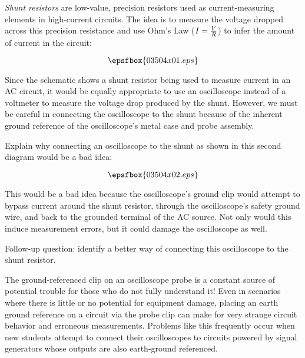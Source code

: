 

{\it Shunt resistors} are low-value, precision resistors used as current-measuring elements in high-current circuits.  The idea is to measure the voltage dropped across this precision resistance and use Ohm's Law ($I = {V \over R}$) to infer the amount of current in the circuit:

$$\epsfbox{03504x01.eps}$$

Since the schematic shows a shunt resistor being used to measure current in an AC circuit, it would be equally appropriate to use an oscilloscope instead of a voltmeter to measure the voltage drop produced by the shunt.  However, we must be careful in connecting the oscilloscope to the shunt because of the inherent ground reference of the oscilloscope's metal case and probe assembly.

Explain why connecting an oscilloscope to the shunt as shown in this second diagram would be a bad idea:

$$\epsfbox{03504x02.eps}$$







This would be a bad idea because the oscilloscope's ground clip would attempt to bypass current around the shunt resistor, through the oscilloscope's safety ground wire, and back to the grounded terminal of the AC source.  Not only would this induce measurement errors, but it could damage the oscilloscope as well.

\vskip 10pt

Follow-up question: identify a better way of connecting this oscilloscope to the shunt resistor.







The ground-referenced clip on an oscilloscope probe is a constant source of potential trouble for those who do not fully understand it!  Even in scenarios where there is little or no potential for equipment damage, placing an earth ground reference on a circuit via the probe clip can make for very strange circuit behavior and erroneous measurements.  Problems like this frequently occur when new students attempt to connect their oscilloscopes to circuits powered by signal generators whose outputs are also earth-ground referenced.

